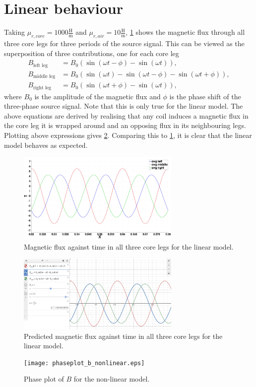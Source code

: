 \section{Linear behaviour}
Taking $\mu_{r, core} = 1000 \frac{\text{H}}{\text{m}}$  and $\mu_{r, air} = 10 \frac{\text{H}}{\text{m}}$, \cref{fig:linear_model} shows the magnetic flux through all three core legs for three periods of the source signal. This can be viewed as the superposition of three contributions, one for each core leg
\begin{align*}
    B_{\text{left leg}} &= B_0\left(\sin(\omega t - \phi) - \sin(\omega t)\right), \\
    B_{\text{middle leg}} &= B_0\left(\sin(\omega t) - \sin(\omega t - \phi) - \sin(\omega t + \phi)\right), \\
    B_{\text{right leg}} &= B_0\left(\sin(\omega t + \phi) - \sin(\omega t)\right),
\end{align*}
where $B_0$ is the amplitude of the magnetic flux and $\phi$ is the phase shift of the three-phase source signal.
Note that this is only true for the linear model. The above equations are derived by realising that any
coil induces a magnetic flux in the core leg it is wrapped around and an opposing flux in its neighbouring legs. Plotting above expressions gives \cref{fig:linear_model_theory}. Comparing this to \cref{fig:linear_model}, it is clear that the linear model behaves as expected.
\begin{figure}
    \centering
    \includegraphics[width=0.7\textwidth]{img/B_phase_plot_linear_mu.png}
    \caption{Magnetic flux against time in all three core legs for the linear model.}
    \label{fig:linear_model}
\end{figure}
\begin{figure}
    \centering
    \includegraphics[width=0.7\textwidth]{img/Screenshot_68.png}
    \caption{Predicted magnetic flux against time in all three core legs for the linear model.}
    \label{fig:linear_model_theory}
\end{figure}
\begin{figure}
    \centering
    \texttt{[image: phaseplot\_b\_nonlinear.eps]}
    \caption{Phase plot of $B$ for the non-linear model.}
    \label{fig:nonlinear_phaseplot}
\end{figure}

